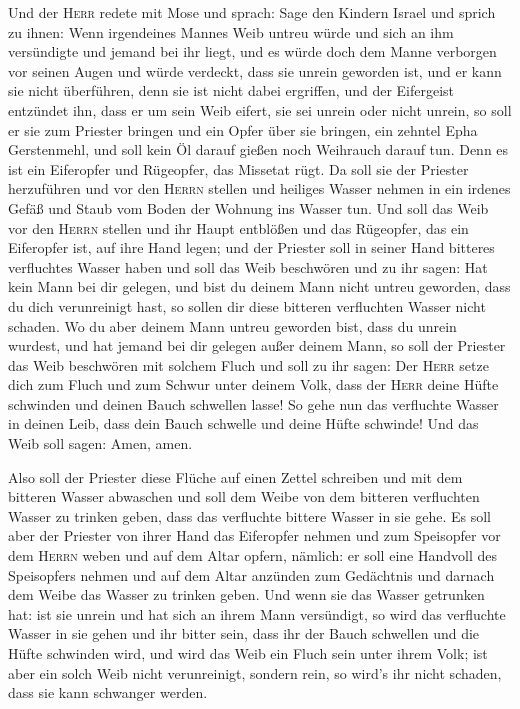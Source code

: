  Und der \textsc{Herr} redete mit Mose und sprach:
 Sage den Kindern Israel und sprich zu ihnen: Wenn
irgendeines Mannes Weib untreu würde und sich an ihm versündigte
 und jemand bei ihr liegt, und es würde doch dem Manne
verborgen vor seinen Augen und würde verdeckt, dass sie unrein geworden
ist, und er kann sie nicht überführen, denn sie ist nicht dabei
ergriffen,  und der Eifergeist entzündet ihn, dass er um
sein Weib eifert, sie sei unrein oder nicht unrein,  so
soll er sie zum Priester bringen und ein Opfer über sie bringen, ein
zehntel Epha Gerstenmehl, und soll kein Öl darauf gießen noch Weihrauch
darauf tun. Denn es ist ein Eiferopfer und Rügeopfer, das Missetat rügt.
 Da soll sie der Priester herzuführen und vor den
\textsc{Herrn} stellen  und heiliges Wasser nehmen in ein
irdenes Gefäß und Staub vom Boden der Wohnung ins Wasser tun.
 Und soll das Weib vor den \textsc{Herrn} stellen und ihr
Haupt entblößen und das Rügeopfer, das ein Eiferopfer ist, auf ihre Hand
legen; und der Priester soll in seiner Hand bitteres verfluchtes Wasser
haben  und soll das Weib beschwören und zu ihr sagen: Hat
kein Mann bei dir gelegen, und bist du deinem Mann nicht untreu
geworden, dass du dich verunreinigt hast, so sollen dir diese bitteren
verfluchten Wasser nicht schaden.  Wo du aber deinem Mann
untreu geworden bist, dass du unrein wurdest, und hat jemand bei dir
gelegen außer deinem Mann,  so soll der Priester das Weib
beschwören mit solchem Fluch und soll zu ihr sagen: Der \textsc{Herr}
setze dich zum Fluch und zum Schwur unter deinem Volk, dass der
\textsc{Herr} deine Hüfte schwinden und deinen Bauch schwellen lasse!
 So gehe nun das verfluchte Wasser in deinen Leib, dass
dein Bauch schwelle und deine Hüfte schwinde! Und das Weib soll sagen:
Amen, amen.

 Also soll der Priester diese Flüche auf einen Zettel
schreiben und mit dem bitteren Wasser abwaschen  und soll
dem Weibe von dem bitteren verfluchten Wasser zu trinken geben, dass das
verfluchte bittere Wasser in sie gehe.  Es soll aber der
Priester von ihrer Hand das Eiferopfer nehmen und zum Speisopfer vor dem
\textsc{Herrn} weben und auf dem Altar opfern, nämlich: 
er soll eine Handvoll des Speisopfers nehmen und auf dem Altar anzünden
zum Gedächtnis und darnach dem Weibe das Wasser zu trinken geben.
 Und wenn sie das Wasser getrunken hat: ist sie unrein
und hat sich an ihrem Mann versündigt, so wird das verfluchte Wasser in
sie gehen und ihr bitter sein, dass ihr der Bauch schwellen und die
Hüfte schwinden wird, und wird das Weib ein Fluch sein unter ihrem Volk;
 ist aber ein solch Weib nicht verunreinigt, sondern
rein, so wird's ihr nicht schaden, dass sie kann schwanger werden.

